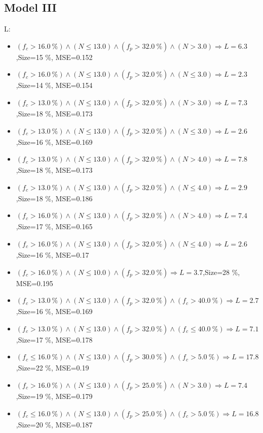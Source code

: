 \documentclass[numbered]{CSL}
\begin{document}
\subsection{Model III}
L:
\begin{itemize}
\item $(f_c > 16.0~\%) \land (N \leq 13.0) \land (f_p > 32.0~\%) \land (N > 3.0) \Rightarrow L = 6.3$,\hfill Size=15 \%, MSE=0.152
\item $(f_c > 16.0~\%) \land (N \leq 13.0) \land (f_p > 32.0~\%) \land (N \leq 3.0) \Rightarrow L = 2.3$,\hfill Size=14 \%, MSE=0.154
\item $(f_c > 13.0~\%) \land (N \leq 13.0) \land (f_p > 32.0~\%) \land (N > 3.0) \Rightarrow L = 7.3$,\hfill Size=18 \%, MSE=0.173
\item $(f_c > 13.0~\%) \land (N \leq 13.0) \land (f_p > 32.0~\%) \land (N \leq 3.0) \Rightarrow L = 2.6$,\hfill Size=16 \%, MSE=0.169
\item $(f_c > 13.0~\%) \land (N \leq 13.0) \land (f_p > 32.0~\%) \land (N > 4.0) \Rightarrow L = 7.8$,\hfill Size=18 \%, MSE=0.173
\item $(f_c > 13.0~\%) \land (N \leq 13.0) \land (f_p > 32.0~\%) \land (N \leq 4.0) \Rightarrow L = 2.9$,\hfill Size=18 \%, MSE=0.186
\item $(f_c > 16.0~\%) \land (N \leq 13.0) \land (f_p > 32.0~\%) \land (N > 4.0) \Rightarrow L = 7.4$,\hfill Size=17 \%, MSE=0.165
\item $(f_c > 16.0~\%) \land (N \leq 13.0) \land (f_p > 32.0~\%) \land (N \leq 4.0) \Rightarrow L = 2.6$,\hfill Size=16 \%, MSE=0.17
\item $(f_c > 16.0~\%) \land (N \leq 10.0) \land (f_p > 32.0~\%) \Rightarrow L = 3.7$,\hfill Size=28 \%, MSE=0.195
\item $(f_c > 13.0~\%) \land (N \leq 13.0) \land (f_p > 32.0~\%) \land (f_c > 40.0~\%) \Rightarrow L = 2.7$,\hfill Size=16 \%, MSE=0.169
\item $(f_c > 13.0~\%) \land (N \leq 13.0) \land (f_p > 32.0~\%) \land (f_c \leq 40.0~\%) \Rightarrow L = 7.1$,\hfill Size=17 \%, MSE=0.178
\item $(f_c \leq 16.0~\%) \land (N \leq 13.0) \land (f_p > 30.0~\%) \land (f_c > 5.0~\%) \Rightarrow L = 17.8$,\hfill Size=22 \%, MSE=0.19
\item $(f_c > 16.0~\%) \land (N \leq 13.0) \land (f_p > 25.0~\%) \land (N > 3.0) \Rightarrow L = 7.4$,\hfill Size=19 \%, MSE=0.179
\item $(f_c \leq 16.0~\%) \land (N \leq 13.0) \land (f_p > 25.0~\%) \land (f_c > 5.0~\%) \Rightarrow L = 16.8$,\hfill Size=20 \%, MSE=0.187

\end{itemize}
\end{document}
